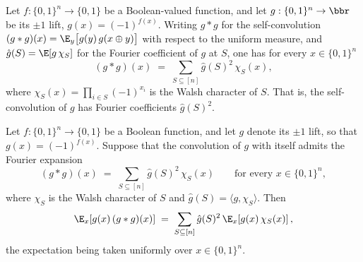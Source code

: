 \begin{lemma}
\label{BoolBLR.triple_expectation_eq_cube_fourier_aux_h_convolution}
\leanok
{}
Let $f : \{0,1\}^n \to \{0,1\}$ be a Boolean-valued function, and let $g : \{0,1\}^n \to
\bbr$ be its $\pm 1$ lift, $g(x) = (-1)^{f(x)}$. Writing $g * g$ for the
self-convolution $(g * g)(x) = \E_{y}\bigl[g(y)\,g(x \oplus y)\bigr]$ with respect to
the uniform measure, and $\hat g(S) = \E[g\,\chi_S]$ for the Fourier coefficient of $g$
at $S$, one has for every $x \in \{0,1\}^n$
\[
  (g * g)(x) \;=\; \sum_{S \subseteq [n]} \hat g(S)^2\, \chi_S(x),
\]
where $\chi_S(x) = \prod_{i \in S} (-1)^{x_i}$ is the Walsh character of $S$. That is,
the self-convolution of $g$ has Fourier coefficients $\hat g(S)^2$.
\end{lemma}

\begin{lemma}
\label{BoolBLR.triple_expectation_eq_cube_fourier_aux_h_substitute}
\leanok
{}
Let $f : \{0,1\}^n \to \{0,1\}$ be a Boolean function, and let $g$ denote its $\pm 1$
lift, so that $g(x) = (-1)^{f(x)}$. Suppose that the convolution of $g$ with itself
admits the Fourier expansion
\[
  (g * g)(x) \;=\; \sum_{S \subseteq [n]} \hat{g}(S)^2\,\chi_S(x)
  \qquad\text{for every } x \in \{0,1\}^n,
\]
where $\chi_S$ is the Walsh character of $S$ and $\hat{g}(S) = \langle g,
\chi_S\rangle$. Then
\[
  \E_x\!\left[g(x)\,(g * g)(x)\right]
  \;=\;
  \sum_{S \subseteq [n]} \hat{g}(S)^2\,\E_x\!\left[g(x)\,\chi_S(x)\right],
\]
the expectation being taken uniformly over $x \in \{0,1\}^n$.
\end{lemma}

